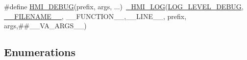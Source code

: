 \begin{DoxyCompactItemize}
\item 
\#define \hyperlink{include_2hmi-debug_8h_a0d26d8b8201011dade787236519711c0}{H\+M\+I\+\_\+\+D\+E\+B\+UG}(prefix,  args, ...)~\hyperlink{src_2hmi-debug_8h_a0846b9d51e2e0612c4825a9a581aa40a}{\+\_\+\+H\+M\+I\+\_\+\+L\+OG}(\hyperlink{src_2hmi-debug_8h_aa5a9053636a30269210c54e734e0d583a538b2b6e011479d408ecd2be0f6d6177}{L\+O\+G\+\_\+\+L\+E\+V\+E\+L\+\_\+\+D\+E\+B\+UG}, \hyperlink{src_2hmi-debug_8h_a5fccb4fc71e44089a1b1a77fc76c0b68}{\+\_\+\+\_\+\+F\+I\+L\+E\+N\+A\+M\+E\+\_\+\+\_\+}, \+\_\+\+\_\+\+F\+U\+N\+C\+T\+I\+O\+N\+\_\+\+\_\+,\+\_\+\+\_\+\+L\+I\+N\+E\+\_\+\+\_\+, prefix, args,\#\#\+\_\+\+\_\+\+V\+A\+\_\+\+A\+R\+G\+S\+\_\+\+\_\+)
\end{DoxyCompactItemize}
\subsection*{Enumerations}
